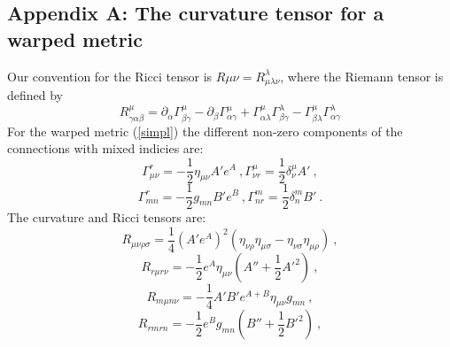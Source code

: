 \documentclass[a4paper,12pt]{article}
\begin{document}
\newpage
\begin{appendix}

\renewcommand{\theequation}{A.\arabic{equation}}
\setcounter{equation}{0}

\section*{Appendix A: The curvature tensor for a warped metric}

Our convention for the Ricci tensor is $R{\mu\nu}= R^{\lambda}
_{\mu\lambda\nu}$, where the Riemann tensor is defined by
\begin{equation}
R^{\mu}_{\gamma\alpha\beta}= \partial_{\alpha} \Gamma^{\mu}
_{\beta\gamma} -\partial_{\beta}\Gamma^{\mu}_{\alpha\gamma} +
\Gamma^{\mu}_{\alpha\lambda} \Gamma^{\lambda}_{\beta\gamma}-
\Gamma^{\mu} _{\beta\lambda}\Gamma^{\lambda}_{\alpha\gamma}
\end{equation}
For the warped metric (\ref{simpl}) the different non-zero components
of the connections with mixed indicies are:
\begin{equation}
\Gamma_{\mu\nu}^r = -\frac{1}{2}\eta_{\mu\nu}A'e^A~,
\Gamma_{\nu r}^\mu=  \frac{1}{2}\delta^\mu_\nu A'~,
\end{equation}
\begin{equation}
\Gamma_{mn}^r = -\frac{1}{2}g_{mn}B'e^B~,
\Gamma_{n r}^m=  \frac{1}{2}\delta^m_n B'~.
\end{equation}
The curvature and Ricci tensors  are:
\begin{equation}
R_{\mu\nu\rho\sigma}=\frac{1}{4}\left(A'e^A\right)^2
\left(\eta_{\nu\rho}\eta_{\mu\sigma}-
\eta_{\nu\sigma}\eta_{\mu\rho}\right)~,
\end{equation}
\begin{equation}
R_{r\mu r\nu}=-\frac{1}{2} e^A
\eta_{\mu\nu}\left(A'' + \frac{1}{2}{A'}^2\right)~,
\end{equation}
\begin{equation}
R_{m\mu n\nu}=-\frac{1}{4} A' B' e^{A+B}\eta_{\mu\nu} g_{mn}~,
\end{equation}
\begin{equation}
R_{rmrn}=-\frac{1}{2} e^B g_{mn}
\left(B'' + \frac{1}{2}{B'}^2\right)~,
\end{equation}

\end{appendix}
\end{document}
